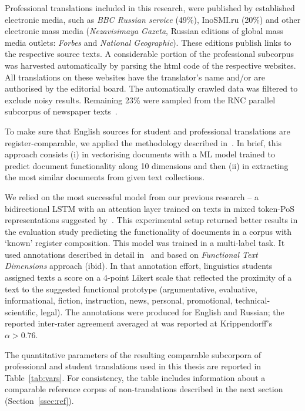 Professional translations included in this research, were published by established electronic media, such as \textit{BBC Russian service}  (49\%), InoSMI.ru (20\%) and other electronic mass media (\textit{Nezavisimaya Gazeta}, Russian editions of global mass media outlets: \textit{Forbes} and \textit{National Geographic}). These editions publish links to the respective source texts. A considerable portion of the professional subcorpus was harvested automatically by parsing the html code of the respective websites. All translations on these websites have the translator's name and/or are authorised by the editorial board.
The automatically crawled data was filtered to exclude noisy results.
Remaining 23\% were sampled from the \gls{RNC} parallel subcorpus of newspaper texts~\cite{Sitchinava2019}. 

\label{pg:stu_pro_made_comparable}
To make sure that  English sources for student and professional translations are register-comparable, we applied the methodology described in~\citet{Kunilovskaya2019similar}. In brief, this approach consists (i) in vectorising documents with a ML model trained to predict document functionality along 10 dimensions and then (ii) in extracting the most similar documents from given text collections.

We relied on the most successful model from our previous research -- a bidirectional LSTM with an attention layer trained on texts in mixed token-PoS representations suggested by~\citet{Baroni2006}. This experimental setup returned better results in the evaluation study predicting the functionality of documents in a corpus with `known' register composition. 
This model was trained in a multi-label task. It used annotations described in detail in~\citet{Sharoff2018} and based on \textit{Functional Text Dimensions} approach (ibid). In that annotation effort, linguistics students assigned texts a score on a 4-point Likert scale that reflected the proximity of a text to the suggested functional prototype (argumentative, evaluative, informational, fiction, instruction, news, personal, promotional, technical-scientific, legal). The annotations were produced for English and Russian; the reported inter-rater agreement averaged at was reported at Krippendorff's $\alpha > 0.76$. 

The quantitative parameters of the resulting comparable subcorpora of professional and student translations used in this thesis are reported in Table~\ref{tab:vars}. For consistency, the table includes information about a comparable reference corpus of non-translations described in the next section (Section~\ref{ssec:ref}).

